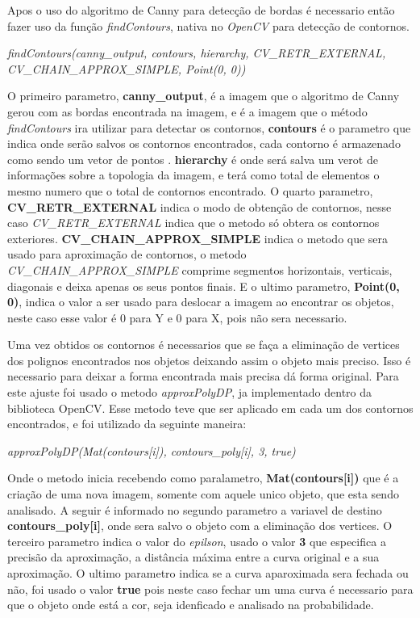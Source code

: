 Apos o uso do algoritmo de Canny para detecção de bordas é necessario então fazer uso da função \textit{findContours}, nativa no \textit{OpenCV} para detecção de contornos.
\begin{center}
\centering \textit{ findContours(canny\_output, contours, hierarchy, CV\_RETR\_EXTERNAL, CV\_CHAIN\_APPROX\_SIMPLE, Point(0, 0))}
\end{center}

O primeiro parametro, \textbf{canny\_output}, é a imagem que o algoritmo de Canny gerou com as bordas encontrada na imagem, e é a imagem que o método \textit{findContours} ira utilizar para detectar os contornos, \textbf{contours} é o parametro que indica onde serão salvos os contornos encontrados, cada contorno é armazenado como sendo um vetor de pontos \cite{OpenCV}. \textbf{hierarchy} é onde será salva um verot de informações sobre a topologia da imagem, e terá como total de elementos o mesmo numero que o total de contornos encontrado\cite{OpenCV}. O quarto parametro, \textbf{CV\_RETR\_EXTERNAL} indica o modo de obtenção de contornos, nesse caso \textit{CV\_RETR\_EXTERNAL} indica que o metodo só obtera os contornos exteriores\cite{OpenCV}. \textbf{CV\_CHAIN\_APPROX\_SIMPLE} indica o metodo que sera usado para aproximação de contornos, o metodo \textit{CV\_CHAIN\_APPROX\_SIMPLE} comprime segmentos horizontais, verticais, diagonais e deixa apenas os seus pontos finais\cite{OpenCV}. E o ultimo parametro, \textbf{Point(0, 0)}, indica o valor a ser usado para deslocar a imagem ao encontrar os objetos, neste caso esse valor é 0 para Y e 0 para X, pois não sera necessario. 

Uma vez obtidos os contornos é necessarios que se faça a eliminação de vertices dos polignos encontrados nos objetos deixando assim o objeto mais preciso. Isso é necessario para deixar a forma encontrada mais precisa dá forma original. Para este ajuste foi usado o metodo \textit{approxPolyDP}, ja implementado dentro da biblioteca OpenCV. Esse metodo teve que ser aplicado em cada um dos contornos encontrados, e foi utilizado da seguinte maneira:
\begin{center}
\centering \textit{    approxPolyDP(Mat(contours[i]), contours\_poly[i], 3, true)}
\end{center}
 Onde o metodo inicia recebendo como paralametro, \textbf{Mat(contours[i])} que é a criação de uma nova imagem, somente com aquele unico objeto, que esta sendo analisado. A seguir é informado no segundo parametro a variavel de destino \textbf{contours\_poly[i]}, onde sera salvo o objeto com a eliminação dos vertices. O terceiro parametro indica o valor do \textit{epilson}, usado o valor \textbf{3} que especifica a precisão da aproximação, a distância máxima entre a curva original e a sua aproximação\cite{OpenCV}. O ultimo parametro indica se a curva aparoximada sera fechada ou não, foi usado o valor \textbf{true} pois neste caso fechar um uma curva é necessario para que o objeto onde está a cor, seja idenficado e analisado na probabilidade.
 

